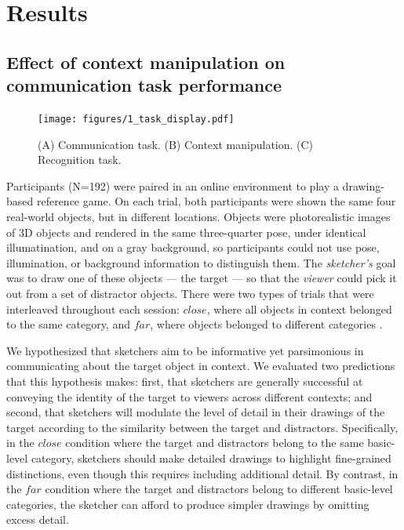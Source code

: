 \documentclass[9pt,twocolumn,twoside]{pnas-new}
\newcommand{\mwu}[1]{{\color{green}{[mwu: #1]}}}
\begin{document}
\section*{Results}

\subsection*{Effect of context manipulation on communication task performance}



\begin{figure}[htbp]
\centering
\texttt{[image: figures/1\_task\_display.pdf]}
\caption{(A) Communication task. (B) Context manipulation. (C) Recognition task.}
\label{task_display}
\end{figure}

Participants (N=192) were paired in an online environment to play a drawing-based reference game. On each trial, both participants were shown the same four real-world objects, but in different locations. Objects were photorealistic images of 3D objects and rendered in the same three-quarter pose, under identical illumatination, and on a gray background, so participants could not use pose, illumination, or background information to distinguish them. The \textit{sketcher's} goal was to draw one of these objects --- the target --- so that the \textit{viewer} could pick it out from a set of distractor objects. There were two types of trials that were interleaved throughout each session: \textit{$close$}, where all objects in context belonged to the same category, and \textit{$far$}, where objects belonged to different categories \mwu{define category here as you talk more about it below}.

We hypothesized that sketchers aim to be informative yet parsimonious in communicating about the target object in context. We evaluated two predictions that this hypothesis makes: first, that sketchers are generally successful at conveying the identity of the target to viewers across different contexts; and second, that sketchers will modulate the level of detail in their drawings \mwu{how do you measure this?} of the target according to the similarity between the target and distractors. Specifically, in the \textit{$close$} condition where the target and distractors belong to the same basic-level category, sketchers should make detailed drawings to highlight fine-grained distinctions, even though this requires including additional detail. By contrast, in the \textit{$far$} condition where the target and distractors belong to different basic-level categories, the sketcher can afford to produce simpler drawings by omitting excess detail.
\end{document}
